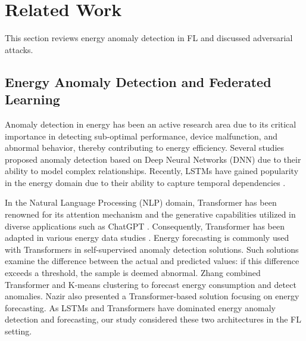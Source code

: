 \section{Related Work}
\label{sec:relatedwork}
\vspace{-0.02in}
This section reviews energy anomaly detection in FL and discussed adversarial attacks.

\subsection{Energy Anomaly Detection and Federated Learning}
\label{sub_sec:AnomalyFL}

Anomaly detection in energy has been an active research area due to its critical importance in detecting sub-optimal performance, device malfunction, and abnormal behavior, thereby contributing to energy efficiency. Several studies  \cite{AnomalyDNN, ChalaDNN2020, somu2021deep, srCNN2021} proposed anomaly detection based on Deep Neural Networks (DNN) due to their ability to model complex relationships. Recently, LSTMs have gained popularity in the energy domain due to their ability to capture temporal dependencies \cite{ChalaDNN2020, somu2021deep}. 

In the Natural Language Processing (NLP) domain, Transformer has been renowned for its attention mechanism and the generative capabilities utilized in diverse applications such as ChatGPT \cite{achiam2023gpt}. Consequently, Transformer has been adapted in various energy data studies \cite{nazir2023forecasting, zhang2021power}. Energy forecasting is commonly used with Transformers in self-supervised anomaly detection solutions. Such solutions examine the difference between the actual and predicted values: if this difference exceeds a threshold, the sample is deemed abnormal. Zhang \etal \cite{zhang2021power} combined Transformer and K-means clustering to forecast energy consumption and detect anomalies. Nazir \etal \cite{nazir2023forecasting} also presented a Transformer-based solution focusing on energy forecasting. As LSTMs and Transformers have dominated energy anomaly detection and forecasting, our study considered these two architectures in the FL setting. 

